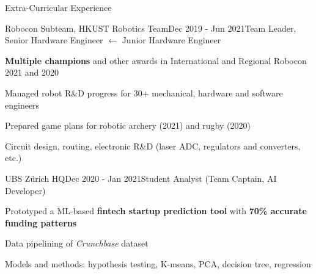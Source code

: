 \documentclass{resume}
\begin{document}
\begin{rSection}{Extra-Curricular Experience}
    
    \begin{rSubsection}{Robocon Subteam, HKUST Robotics Team}{Dec 2019 - Jun 2021}{Team Leader, Senior Hardware Engineer $\leftarrow$ Junior Hardware Engineer}{}
        \item \textbf{Multiple champions} and other awards in International and Regional Robocon 2021 and 2020
        \item Managed robot R\&D progress for 30+ mechanical, hardware and software engineers
        \item Prepared game plans for robotic archery (2021) and rugby (2020)
        \item Circuit design, routing, electronic R\&D (laser ADC, regulators and converters, etc.)
    \end{rSubsection}

    \begin{rSubsection}{UBS Zürich HQ}{Dec 2020 - Jan 2021}{Student Analyst (Team Captain, AI Developer)}{}
        \item Prototyped a ML-based \textbf{fintech startup prediction tool} with \textbf{70\% accurate funding patterns}
        \item Data pipelining of \emph{Crunchbase} dataset
        \item Models and methods: hypothesis testing, K-means, PCA, decision tree, regression
    \end{rSubsection}

\end{rSection}
\end{document}
